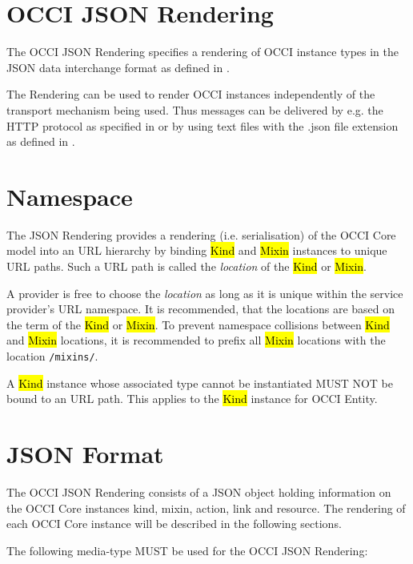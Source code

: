 \documentclass[10pt,a4paper]{article}
\begin{document}
\section{OCCI JSON Rendering}

The OCCI JSON Rendering specifies a rendering of OCCI instance types in the JSON
data interchange format as defined in \cite{rfc4627}.

The Rendering can be used to render OCCI instances independently of the
transport mechanism being used. Thus messages can be delivered by e.g. the HTTP
protocol as specified in \cite{occi:http_rendering} or by using text files with
the .json file extension as defined in \cite{rfc4627}.

\section{Namespace}

The JSON Rendering provides a rendering (i.e. serialisation) of the OCCI 
Core model into an URL hierarchy by binding
\hl{Kind} and \hl{Mixin} instances to unique URL paths. Such a URL path is
called the {\em location} of the \hl{Kind} or \hl{Mixin}.

A provider is free to choose the {\em location} as long as it is unique
within the service provider's URL namespace. It is recommended, that the
locations are based on the term of the \hl{Kind} or \hl{Mixin}. To prevent
namespace collisions between \hl{Kind} and \hl{Mixin} locations, it is
recommended to prefix all \hl{Mixin} locations with the location {\tt /mixins/}.

A \hl{Kind} instance whose associated type cannot be instantiated MUST NOT be
bound to an URL path. This applies to the \hl{Kind} instance for OCCI Entity.


\section{JSON Format}
\label{sec:json_format}
The OCCI JSON Rendering consists of a JSON object holding information on the 
OCCI Core instances kind, mixin, action, link and resource. The rendering of
each OCCI Core instance will be described in the following sections. 


The following media-type MUST be used for the OCCI JSON Rendering:
\end{document}
